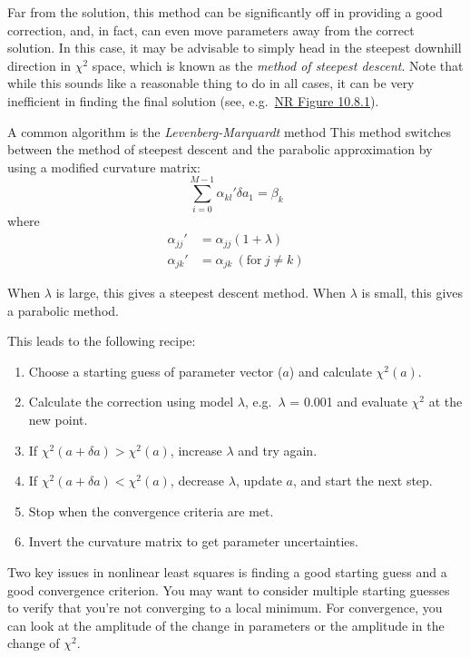 \documentclass{article}
\begin{document}
Far from the solution, this method can be significantly off in
providing a good correction, and, in fact, can even move parameters
away from the correct solution. In this case, it may be advisable to
simply head in the steepest downhill direction in $\chi^{2}$
space, which is known as the \textit{method of steepest descent}. Note that
while this sounds like a reasonable thing to do in all cases, it can
be very inefficient in finding the final solution
(see, e.g.\ \href{http://astronomy.nmsu.edu/holtz/a575/images/NR10.8.1.png}
{NR Figure 10.8.1}).

A common algorithm is the \textit{Levenberg-Marquardt} method This method
switches between the method of steepest descent and the parabolic approximation
by using a modified curvature matrix:
\[
    \sum_{i=0}^{M-1} \alpha_{kl}'\delta{a_1} = \beta_{k}
    \]
where
\begin{align*}
    \alpha_{jj}' &= \alpha_{jj}(1+\lambda)\\
    \alpha_{jk}' &= \alpha_{jk}\ (\textrm{for}\ j \neq k)
\end{align*}

When $\lambda$ is large, this gives a steepest descent method.
When $\lambda$ is small, this gives a parabolic method.

This leads to the following recipe:
\begin{enumerate}
    \item Choose a starting guess of parameter vector ($a$) and
        calculate $\chi^{2}(a)$.
    \item Calculate the correction using model $\lambda$,
        e.g.\ $\lambda$ = 0.001 and evaluate $\chi^{2}$ at the new point.
    \item If $\chi^{2}(a + \delta a) > \chi^{2}(a)$, increase $\lambda$
        and try again.
    \item If $\chi^{2}(a + \delta a) < \chi^{2}(a)$, decrease $\lambda$,
        update $a$, and start the next step.
    \item Stop when the convergence criteria are met.
    \item Invert the curvature matrix to get parameter uncertainties.
\end{enumerate}

Two key issues in nonlinear least squares is finding a good starting
guess and a good convergence criterion. You may want to consider
multiple starting guesses to verify that you're not converging to a
local minimum. For convergence, you can look at the amplitude of the
change in parameters or the amplitude in the change of $ \chi^{2}$.
\end{document}
